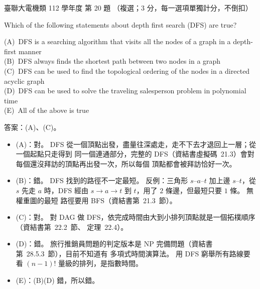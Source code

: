\begin{pastexam}[label={px:ust-112-ee-ds-20}]{臺聯大電機類 112 學年度 第 20 題}
（複選；3 分，每一選項單獨計分，不倒扣）

Which of the following statements about depth first search (DFS) are true?

(A)~DFS is a searching algorithm that visits all the nodes of a graph in a depth-first manner\\
(B)~DFS always finds the shortest path between two nodes in a graph\\
(C)~DFS can be used to find the topological ordering of the nodes in a directed acyclic graph\\
(D)~DFS can be used to solve the traveling salesperson problem in polynomial time\\
(E)~All of the above is true
\end{pastexam}

\begin{pastsoln}
答案：(A)、(C)。

\begin{itemize}
\item (A)：對。 DFS 從一個頂點出發，盡量往深處走，走不下去才退回上一層；從一個起點只走得到
同一個連通部分，完整的 DFS（資結書虛擬碼~21.3）會對每個還沒拜訪的頂點再出發一次，所以每個
頂點都會被拜訪恰好一次。
\item (B)：錯。 DFS 找到的路徑不一定最短。 反例：三角形 $s$--$a$--$t$ 加上邊 $s$--$t$，從 $s$
先走 $a$ 時，DFS 經由 $s \to a \to t$ 到 $t$，用了 $2$ 條邊，但最短只要 $1$ 條。 無權重圖的最短
路徑要用 BFS（資結書第~21.3~節）。
\item (C)：對。 對 DAG 做 DFS，依完成時間由大到小排列頂點就是一個拓樸順序（資結書第~22.2~節、
定理~22.4）。
\item (D)：錯。 旅行推銷員問題的判定版本是 NP 完備問題（資結書第~28.5.3~節），目前不知道有
多項式時間演算法。 用 DFS 窮舉所有路線要看 $(n - 1)!$ 量級的排列，是指數時間。
\item (E)：(B)(D) 錯，所以錯。
\end{itemize}
\end{pastsoln}

